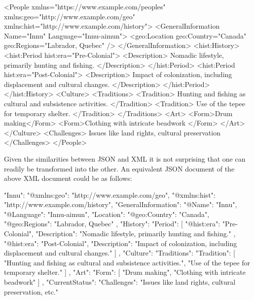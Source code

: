 \begin{xmlcode}
<People
      xmlns="https://www.example.com/peoples"
      xmlns:geo="http://www.example.com/geo" 
      xmlns:hist="http://www.example.com/history">
    <GeneralInformation 
            Name="Innu" Language="Innu-aimun">
        <geo:Location geo:Country="Canada" 
                  geo:Regions="Labrador, Quebec" />
    </GeneralInformation>
    <hist:History>
        <hist:Period hist:era="Pre-Colonial">
            <Description>
                Nomadic lifestyle, primarily 
                hunting and fishing.
            </Description>
        </hist:Period>
        <hist:Period hist:era="Post-Colonial">
            <Description>
                Impact of colonization, 
                including displacement and 
                cultural changes.
            </Description>
        </hist:Period>
    </hist:History>
    <Culture>
        <Traditions>
            <Tradition>
                Hunting and fishing as cultural 
                and subsistence activities.
            </Tradition>
            <Tradition>
                Use of the tepee for temporary 
                shelter.
            </Tradition>
        </Traditions>
        <Art>
            <Form>Drum making</Form>
            <Form>Clothing with intricate beadwork
            </Form>
        </Art>
    </Culture>
    <Challenges>
        Issues like land rights, cultural preservation
    </Challenges>
</People>
\end{xmlcode}

Given the similarities between JSON and XML it is not surprising that one can readily be transformed into the other. An equivalent JSON document of the above XML document could be as follows:

\begin{jsoncode}
"Innu": {
	"@xmlns:geo": "http://www.example.com/geo",
	"@xmlns:hist": "http://www.example.com/history",
	"GeneralInformation": {
		"@Name": "Innu",
		"@Language": "Innu-aimun",
		"Location": {
			"@geo:Country": "Canada",
			"@geo:Regions": "Labrador, Quebec"
		}
	},
	"History": {
		"Period": [
			{
				"@hist:era": "Pre-Colonial",
				"Description": "Nomadic lifestyle, 
				     primarily hunting and fishing."
			},
			{
				"@hist:era": "Post-Colonial",
				"Description": "Impact of colonization, 
				     including displacement and 
				     cultural changes."
			}
		]
	},
	"Culture": {
		"Traditions": {
			"Tradition": [
				"Hunting and fishing as cultural and 
				     subsistence activities.",
				"Use of the tepee for temporary shelter."
			]
		},
		"Art": {
			"Form": [
				"Drum making",
				"Clothing with intricate beadwork"
			]
		}
	},
	"CurrentStatus": {
		"Challenges": "Issues like land rights, 
		     cultural preservation, etc."
	}
}
\end{jsoncode}


